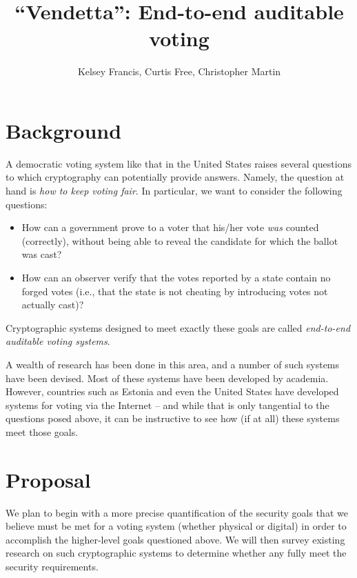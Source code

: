 \documentclass[twocolumn]{article}
\title{``Vendetta'': End-to-end auditable voting}
\date{}
\author{Kelsey Francis, Curtis Free, Christopher Martin}
\newcommand{\term}[1]{\textit{#1}}
\begin{document}
	\maketitle

	\section{Background}

		A democratic voting system like that in the United States raises several questions to which
		cryptography can potentially provide answers. Namely, the question at hand is \emph{how to keep
		voting fair}. In particular, we want to consider the following questions:
		\begin{itemize}

			\item
				How can a government prove to a voter that his/her vote \emph{was} counted (correctly),
				without being able to reveal the candidate for which the ballot was cast?

			\item
				How can an observer verify that the votes reported by a state contain no forged votes (i.e.,
				that the state is not cheating by introducing votes not actually cast)?

		\end{itemize}
		Cryptographic systems designed to meet exactly these goals are called \term{end-to-end auditable
		voting systems}\cite{end_to_end}.

		A wealth of research has been done in this area, and a number of such systems have been devised.
		Most of these systems have been developed by academia. However, countries such as Estonia and
		even the United States have developed systems for voting via the Internet
		\cite{estonia,us_vs_est} -- and while that is only tangential to the questions posed above, it
		can be instructive to see how (if at all) these systems meet those goals.

	\section{Proposal}

		We plan to begin with a more precise quantification of the security goals that we believe must
		be met for a voting system (whether physical or digital) in order to accomplish the higher-level
		goals questioned above. We will then survey existing research on such cryptographic systems to
		determine whether any fully meet the security requirements.
\end{document}
